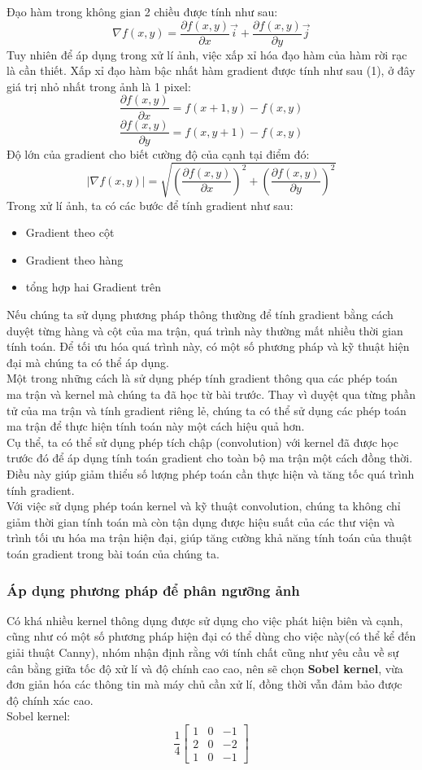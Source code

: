 \noindent Đạo hàm trong không gian 2 chiều được tính như sau:
\[
    \nabla f(x,y) = \frac{\partial f(x,y)}{\partial x} \Vec{i} + \frac{\partial f(x,y)}{\partial y} \Vec{j}
\]
Tuy nhiên để áp dụng trong xử lí ảnh, việc xấp xỉ hóa đạo hàm của hàm rời rạc là cần thiết. Xấp xỉ đạo hàm bậc nhất hàm gradient được tính như sau (1), ở đây giá trị nhỏ nhất trong ảnh là 1 pixel:
\[
\frac{\partial f(x,y)}{\partial x} = f(x+1,y) - f(x,y)
\]
\[
\frac{\partial f(x,y)}{\partial y} = f(x,y+1) - f(x,y)
\]
Độ lớn của gradient cho biết cường độ của cạnh tại điểm đó:
\[
|\nabla f(x,y)| = \sqrt{\left( \frac{\partial f(x,y)}{\partial x}\right)^2 + \left(\frac{\partial f(x,y)}{\partial y}\right)^2}
\]
Trong xử lí ảnh, ta có các bước để tính gradient như sau:
\begin{itemize}
    \item Gradient theo cột
    \item Gradient theo hàng
    \item tổng hợp hai Gradient trên
\end{itemize}
Nếu chúng ta sử dụng phương pháp thông thường để tính gradient bằng cách duyệt từng hàng và cột của ma trận, quá trình này thường mất nhiều thời gian tính toán. Để tối ưu hóa quá trình này, có một số phương pháp và kỹ thuật hiện đại mà chúng ta có thể áp dụng.\\
Một trong những cách là sử dụng phép tính gradient thông qua các phép toán ma trận và kernel mà chúng ta đã học từ bài trước. Thay vì duyệt qua từng phần tử của ma trận và tính gradient riêng lẻ, chúng ta có thể sử dụng các phép toán ma trận để thực hiện tính toán này một cách hiệu quả hơn.\\
Cụ thể, ta có thể sử dụng phép tích chập (convolution) với kernel đã được học trước đó để áp dụng tính toán gradient cho toàn bộ ma trận một cách đồng thời. Điều này giúp giảm thiểu số lượng phép toán cần thực hiện và tăng tốc quá trình tính gradient.\\
Với việc sử dụng phép toán kernel và kỹ thuật convolution, chúng ta không chỉ giảm thời gian tính toán mà còn tận dụng được hiệu suất của các thư viện và trình tối ưu hóa ma trận hiện đại, giúp tăng cường khả năng tính toán của thuật toán gradient trong bài toán của chúng ta.

\subsubsection{Áp dụng phương pháp để phân ngưỡng ảnh}
Có khá nhiều kernel thông dụng được sử dụng cho việc phát hiện biên và cạnh, cũng như có một số phương pháp hiện đại có thể dùng cho việc này(có thể kể đến giải thuật Canny), nhóm nhận định rằng với tính chất cũng như yêu cầu về sự cân bằng giữa tốc độ xử lí và độ chính cao cao, nên sẽ chọn \textbf{Sobel kernel}, vừa đơn giản hóa các thông tin mà máy chủ cần xử lí, đồng thời vẫn đảm bảo được độ chính xác cao.\\
Sobel kernel:
\[\frac{1}{4}
\left[
    \begin{array}{ccc}
        1 & 0 & -1  \\
        2 & 0 & -2 \\
        1 & 0 & -1
    \end{array}
\right]
\]

